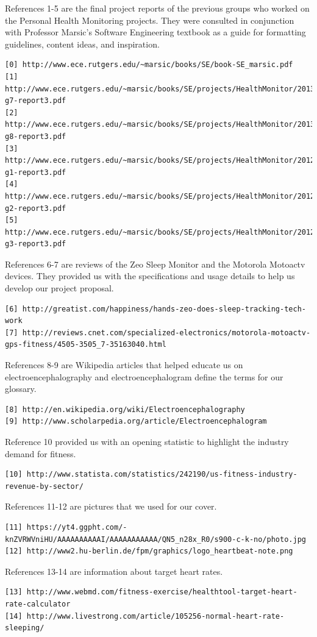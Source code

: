 \documentclass[letterpaper,english, 12pt]{scrreprt}
\begin{document}
References 1-5 are the final project reports of the previous groups who worked on the Personal Health Monitoring projects. They were consulted in conjunction with Professor Marsic's Software Engineering textbook as a guide for formatting guidelines, content ideas, and inspiration. 
\begin{verbatim}
[0] http://www.ece.rutgers.edu/~marsic/books/SE/book-SE_marsic.pdf
[1] http://www.ece.rutgers.edu/~marsic/books/SE/projects/HealthMonitor/2013-g7-report3.pdf
[2] http://www.ece.rutgers.edu/~marsic/books/SE/projects/HealthMonitor/2013-g8-report3.pdf
[3] http://www.ece.rutgers.edu/~marsic/books/SE/projects/HealthMonitor/2012-g1-report3.pdf
[4] http://www.ece.rutgers.edu/~marsic/books/SE/projects/HealthMonitor/2012-g2-report3.pdf
[5] http://www.ece.rutgers.edu/~marsic/books/SE/projects/HealthMonitor/2012-g3-report3.pdf
\end{verbatim}
References 6-7 are reviews of the Zeo Sleep Monitor and the Motorola Motoactv devices. They provided us with the specifications and usage details to help us develop our project proposal.
\begin{verbatim}
[6] http://greatist.com/happiness/hands-zeo-does-sleep-tracking-tech-work
[7] http://reviews.cnet.com/specialized-electronics/motorola-motoactv-gps-fitness/4505-3505_7-35163040.html
\end{verbatim}

References 8-9 are Wikipedia articles that helped educate us on electroencephalography and electroencephalogram define the terms for our glossary.
\begin{verbatim}
[8] http://en.wikipedia.org/wiki/Electroencephalography
[9] http://www.scholarpedia.org/article/Electroencephalogram
\end{verbatim}

Reference 10 provided us with an opening statistic to highlight the industry demand for fitness.
\begin{verbatim}
[10] http://www.statista.com/statistics/242190/us-fitness-industry-revenue-by-sector/
\end{verbatim}

References 11-12 are pictures that we used for our cover.
\begin{verbatim}
[11] https://yt4.ggpht.com/-knZVRWVniHU/AAAAAAAAAAI/AAAAAAAAAAA/QN5_n28x_R0/s900-c-k-no/photo.jpg
[12] http://www2.hu-berlin.de/fpm/graphics/logo_heartbeat-note.png
\end{verbatim}


References 13-14 are information about target heart rates.
\begin{verbatim}
[13] http://www.webmd.com/fitness-exercise/healthtool-target-heart-rate-calculator
[14] http://www.livestrong.com/article/105256-normal-heart-rate-sleeping/
\end{verbatim}
\end{document}

